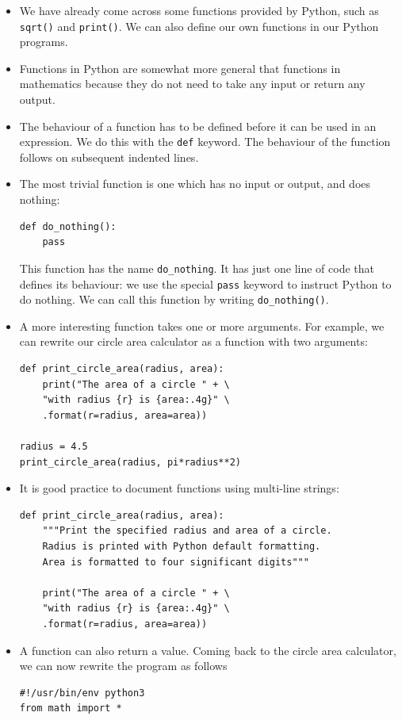 \documentclass[a4paper,twoside,titlepage]{memoir}
\newcommand{\shellcmd}{\texttt}
\begin{document}
\begin{itemize}
	\item We have already come across some functions provided by Python, such as \shellcmd{sqrt()} and \shellcmd{print()}.  We can also define our own functions in our Python programs.
	\item Functions in Python are somewhat more general that functions in mathematics because they do not need to take any input or return any output.
	\item The behaviour of a function has to be defined before it can be used in an expression.  We do this with the \shellcmd{def} keyword.  The behaviour of the function follows on subsequent indented lines.
\index{def@\shellcmd{def}}
	\item The most trivial function is one which has no input or output, and does nothing:
\begin{verbatim}
def do_nothing():
	pass
\end{verbatim}
This function has the name \shellcmd{do\_nothing}.  It has just one line of code that defines its behaviour: we use the special \shellcmd{pass} keyword to instruct Python to do nothing.  We can call this function by writing \shellcmd{do\_nothing()}.
\index{pass@\shellcmd{pass}}
	\item A more interesting function takes one or more arguments.  For example, we can rewrite our circle area calculator as a function with two arguments:
\begin{verbatim}
def print_circle_area(radius, area):
	print("The area of a circle " + \
	"with radius {r} is {area:.4g}" \
	.format(r=radius, area=area))

radius = 4.5
print_circle_area(radius, pi*radius**2)
\end{verbatim}
\item It is good practice to document functions using multi-line strings:
\begin{verbatim}
def print_circle_area(radius, area):
	"""Print the specified radius and area of a circle.
	Radius is printed with Python default formatting.
	Area is formatted to four significant digits"""

	print("The area of a circle " + \
	"with radius {r} is {area:.4g}" \
	.format(r=radius, area=area))
\end{verbatim}

\item A function can also return a value.  Coming back to the circle area calculator, we can now rewrite the program as follows
\index{return@\shellcmd{return}}
\begin{verbatim}
#!/usr/bin/env python3
from math import *


\end{verbatim}
\end{itemize}
\end{document}
